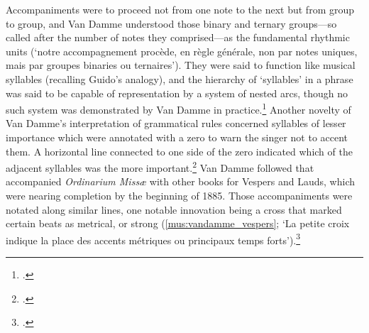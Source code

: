 Accompaniments were to proceed not from one note to the next but from group to group, and Van Damme understood those binary and ternary groups---so called after the number of notes they comprised---as the fundamental rhythmic units (`notre accompagnement procède, en règle générale, non par notes uniques, mais par groupes binaries ou ternaires').
They were said to function like musical syllables (recalling Guido's analogy), and the hierarchy of `syllables' in a phrase was said to be capable of representation by a system of nested arcs, though no such system was demonstrated by Van Damme in practice.\footcite[23]{VanDammeUtilitepratiqueGraduel1883a}
Another novelty of Van Damme's interpretation of grammatical rules concerned syllables of lesser importance which were annotated with a zero to warn the singer not to accent them.
A horizontal line connected to one side of the zero indicated which of the adjacent syllables was the more important.\footnote{\cite[pp.~iii--v, 7; Although no date of publication is printed on the text itself, its imminent publication is announced in the September--October 1884 issue of \emph{Musica sacra}]{VanDammeOrdinariummissaeordinariire1884}.\label{fn:vandamme_ordinary}}
Van Damme followed that accompanied \emph{Ordinarium Missæ} with other books for Vespers and Lauds, which were nearing completion by the beginning of 1885.
Those accompaniments were notated along similar lines, one notable innovation being a cross that marked certain beats as metrical, or strong (\cref{mus:vandamme_vespers}; `La petite croix indique la place des accents métriques ou principaux temps forts').\footcites[p.~43 n.~1]{Kornmullerprincipalesobligationsmaitres1885}[pp.~iv, 13; The text in question, along with \emph{Psalmi vesperarum~: les psaumes des Vèpres pour tous les Dimanches et fêtes de l'année}, is announced in the September 1885 issue of \emph{Musica sacra}]{VanDammeVesperaelaudesvespertinae1885}


